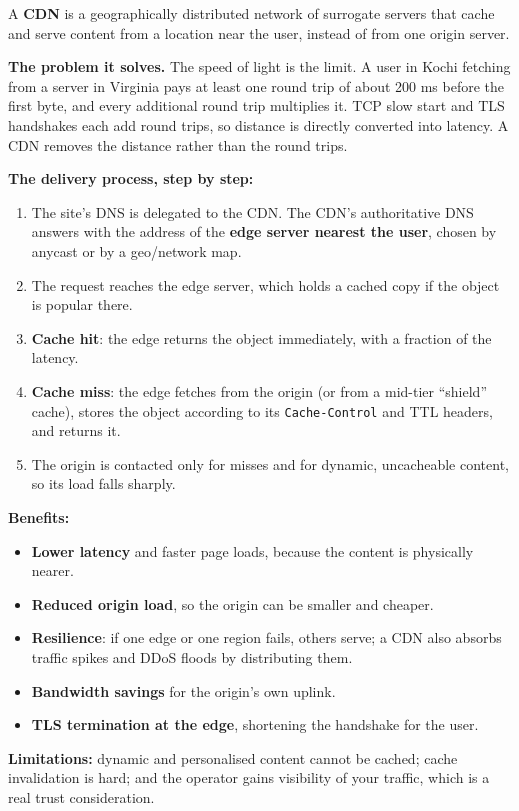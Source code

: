 \documentclass[11pt,a4paper]{article}
\begin{document}
\begin{solbox}
A \textbf{CDN} is a geographically distributed network of surrogate servers that cache and serve content from a location near the user, instead of from one origin server.

\textbf{The problem it solves.} The speed of light is the limit. A user in Kochi fetching from a server in Virginia pays at least one round trip of about 200 ms before the first byte, and every additional round trip multiplies it. TCP slow start and TLS handshakes each add round trips, so distance is directly converted into latency. A CDN removes the distance rather than the round trips.

\textbf{The delivery process, step by step:}
\begin{enumerate}
\item The site's DNS is delegated to the CDN. The CDN's authoritative DNS answers with the address of the \textbf{edge server nearest the user}, chosen by anycast or by a geo/network map.
\item The request reaches the edge server, which holds a cached copy if the object is popular there.
\item \textbf{Cache hit}: the edge returns the object immediately, with a fraction of the latency.
\item \textbf{Cache miss}: the edge fetches from the origin (or from a mid-tier ``shield'' cache), stores the object according to its \texttt{Cache-Control} and TTL headers, and returns it.
\item The origin is contacted only for misses and for dynamic, uncacheable content, so its load falls sharply.
\end{enumerate}

\textbf{Benefits:}
\begin{itemize}
\item \textbf{Lower latency} and faster page loads, because the content is physically nearer.
\item \textbf{Reduced origin load}, so the origin can be smaller and cheaper.
\item \textbf{Resilience}: if one edge or one region fails, others serve; a CDN also absorbs traffic spikes and DDoS floods by distributing them.
\item \textbf{Bandwidth savings} for the origin's own uplink.
\item \textbf{TLS termination at the edge}, shortening the handshake for the user.
\end{itemize}

\textbf{Limitations:} dynamic and personalised content cannot be cached; cache invalidation is hard; and the operator gains visibility of your traffic, which is a real trust consideration.
\end{solbox}
\end{document}
